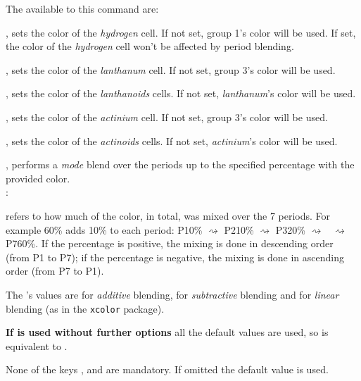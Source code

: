 \vspace{10pt}
The  available to this command are:
\vspace{4pt}
\begin{itemlist}
\item{}, sets the color of the \textit{hydrogen} cell. If not set, group 1's color will be used. If set, the color of the \textit{hydrogen} cell won't be affected by period blending.
\item{}, sets the color of the \textit{lanthanum} cell. If not set, group 3's color will be used.
\item{}, sets the color of the \textit{lanthanoids} cells. If not set, \textit{lanthanum}'s color will be used.
\item{}, sets the color of the \textit{actinium} cell. If not set, group 3's color will be used.
\item{}, sets the color of the \textit{actinoids} cells. If not set, \textit{actinium}'s color will be used.
\item{}, performs a \textit{mode} blend over the periods up to the specified percentage with the provided color.
\\ [3pt]:
\begin{itembar}
\item {} refers to how much of the color, in total, was mixed over the 7 periods. For example 60\% adds 10\% to each period: P1\raisebox{.8pt}{$\blacktriangleright$}0\% $\rightsquigarrow$ P2\raisebox{.8pt}{$\blacktriangleright$}10\% $\rightsquigarrow$ P3\raisebox{.8pt}{$\blacktriangleright$}20\% $\rightsquigarrow$ \myldots\ $\rightsquigarrow$ P7\raisebox{.8pt}{$\blacktriangleright$}60\%. If the percentage is positive, the mixing is done in descending order (from P1 to P7); if the percentage is negative, the mixing is done in ascending order (from P7 to P1).
\item The 's values are  for \textit{additive} blending,  for \textit{subtractive} blending and  for \textit{linear} blending (as in the \texttt{\small xcolor} package).
\item \textbf{If  is used without further options} all the default values are used, so  is equivalent to .
\item None of the keys ,  and  are mandatory. If omitted the default value is used.
\end{itembar}
\end{itemlist}
